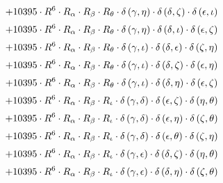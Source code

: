 \begin{subequations}
\begin{gather}
 \\[0.2em] \notag 		 + 10395 \cdot R^{6} \cdot R_{\alpha{}} \cdot R_{\beta{}} \cdot R_{\theta{}} \cdot \delta{}\left(\gamma{}, \eta{}\right) \cdot \delta{}\left(\delta{}, \zeta{}\right) \cdot \delta{}\left(\epsilon{}, \iota{}\right) 
 \\[0.2em] \notag 		 + 10395 \cdot R^{6} \cdot R_{\alpha{}} \cdot R_{\beta{}} \cdot R_{\theta{}} \cdot \delta{}\left(\gamma{}, \eta{}\right) \cdot \delta{}\left(\delta{}, \iota{}\right) \cdot \delta{}\left(\epsilon{}, \zeta{}\right) 
 \\[0.2em] \notag 		 + 10395 \cdot R^{6} \cdot R_{\alpha{}} \cdot R_{\beta{}} \cdot R_{\theta{}} \cdot \delta{}\left(\gamma{}, \iota{}\right) \cdot \delta{}\left(\delta{}, \epsilon{}\right) \cdot \delta{}\left(\zeta{}, \eta{}\right) 
 \\[0.2em] \notag 		 + 10395 \cdot R^{6} \cdot R_{\alpha{}} \cdot R_{\beta{}} \cdot R_{\theta{}} \cdot \delta{}\left(\gamma{}, \iota{}\right) \cdot \delta{}\left(\delta{}, \zeta{}\right) \cdot \delta{}\left(\epsilon{}, \eta{}\right) 
 \\[0.2em] \notag 		 + 10395 \cdot R^{6} \cdot R_{\alpha{}} \cdot R_{\beta{}} \cdot R_{\theta{}} \cdot \delta{}\left(\gamma{}, \iota{}\right) \cdot \delta{}\left(\delta{}, \eta{}\right) \cdot \delta{}\left(\epsilon{}, \zeta{}\right) 
 \\[0.2em] \notag 		 + 10395 \cdot R^{6} \cdot R_{\alpha{}} \cdot R_{\beta{}} \cdot R_{\iota{}} \cdot \delta{}\left(\gamma{}, \delta{}\right) \cdot \delta{}\left(\epsilon{}, \zeta{}\right) \cdot \delta{}\left(\eta{}, \theta{}\right) 
 \\[0.2em] \notag 		 + 10395 \cdot R^{6} \cdot R_{\alpha{}} \cdot R_{\beta{}} \cdot R_{\iota{}} \cdot \delta{}\left(\gamma{}, \delta{}\right) \cdot \delta{}\left(\epsilon{}, \eta{}\right) \cdot \delta{}\left(\zeta{}, \theta{}\right) 
 \\[0.2em] \notag 		 + 10395 \cdot R^{6} \cdot R_{\alpha{}} \cdot R_{\beta{}} \cdot R_{\iota{}} \cdot \delta{}\left(\gamma{}, \delta{}\right) \cdot \delta{}\left(\epsilon{}, \theta{}\right) \cdot \delta{}\left(\zeta{}, \eta{}\right) 
 \\[0.2em] \notag 		 + 10395 \cdot R^{6} \cdot R_{\alpha{}} \cdot R_{\beta{}} \cdot R_{\iota{}} \cdot \delta{}\left(\gamma{}, \epsilon{}\right) \cdot \delta{}\left(\delta{}, \zeta{}\right) \cdot \delta{}\left(\eta{}, \theta{}\right) 
 \\[0.2em] \notag 		 + 10395 \cdot R^{6} \cdot R_{\alpha{}} \cdot R_{\beta{}} \cdot R_{\iota{}} \cdot \delta{}\left(\gamma{}, \epsilon{}\right) \cdot \delta{}\left(\delta{}, \eta{}\right) \cdot \delta{}\left(\zeta{}, \theta{}\right) 

\end{gather}
\end{subequations}
